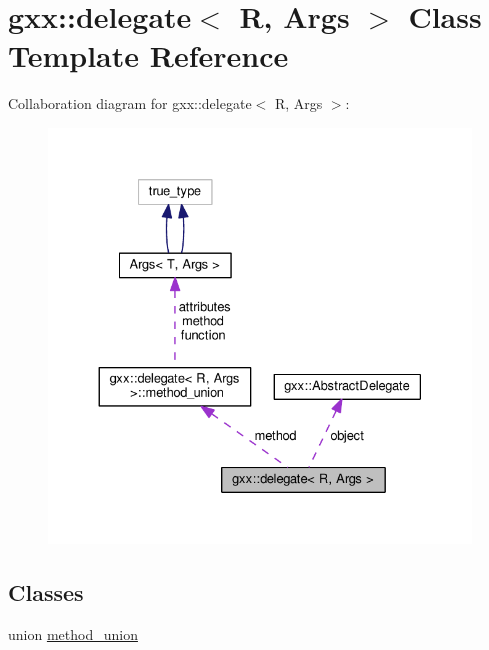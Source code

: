 \hypertarget{classgxx_1_1delegate}{}\section{gxx\+:\+:delegate$<$ R, Args $>$ Class Template Reference}
\label{classgxx_1_1delegate}


Collaboration diagram for gxx\+:\+:delegate$<$ R, Args $>$\+:
\nopagebreak
\begin{figure}[H]
\begin{center}
\leavevmode
\includegraphics[width=330pt]{classgxx_1_1delegate__coll__graph}
\end{center}
\end{figure}
\subsection*{Classes}
\begin{DoxyCompactItemize}
\item 
union \hyperlink{uniongxx_1_1delegate_1_1method__union}{method\+\_\+union}
\end{DoxyCompactItemize}
